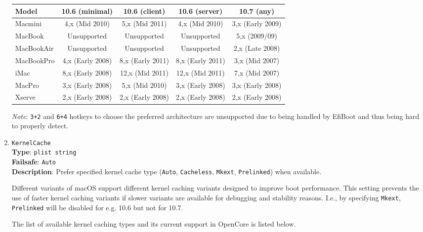 \documentclass[]{article}
\begin{document}
\begin{enumerate}
  \begin{center}
  \begin{tabular}{|p{0.9in}|c|c|c|c|}
  \hline
  \textbf{Model} & \textbf{10.6 (minimal)} & \textbf{10.6 (client)} & \textbf{10.6 (server)} & \textbf{10.7 (any)} \\
  \hline
  Macmini & 4,x (Mid 2010) & 5,x (Mid 2011) & 4,x (Mid 2010) & 3,x (Early 2009) \\
  \hline
  MacBook & Unsupported & Unsupported & Unsupported & 5,x (2009/09) \\
  \hline
  MacBookAir & Unsupported & Unsupported & Unsupported & 2,x (Late 2008) \\
  \hline
  MacBookPro & 4,x (Early 2008) & 8,x (Early 2011) & 8,x (Early 2011) & 3,x (Mid 2007) \\
  \hline
  iMac & 8,x (Early 2008) & 12,x (Mid 2011) & 12,x (Mid 2011) & 7,x (Mid 2007) \\
  \hline
  MacPro & 3,x (Early 2008) & 5,x (Mid 2010) & 3,x (Early 2008) & 3,x (Early 2008) \\
  \hline
  Xserve & 2,x (Early 2008) & 2,x (Early 2008) & 2,x (Early 2008) & 2,x (Early 2008) \\
  \hline
  \end{tabular}
  \end{center}

  \emph{Note}: \texttt{3+2} and \texttt{6+4} hotkeys to choose the preferred
  architecture are unsupported due to being handled by EfiBoot and thus
  being hard to properly detect.

\item
  \texttt{KernelCache}\\
  \textbf{Type}: \texttt{plist\ string}\\
  \textbf{Failsafe}: \texttt{Auto}\\
  \textbf{Description}: Prefer specified kernel cache type (\texttt{Auto}, \texttt{Cacheless},
  \texttt{Mkext}, \texttt{Prelinked}) when available.

  Different variants of macOS support different kernel caching variants designed to improve
  boot performance. This setting prevents the use of faster kernel caching variants
  if slower variants are available for debugging and stability reasons. I.e., by
  specifying \texttt{Mkext}, \texttt{Prelinked} will be disabled for e.g. 10.6 but not for 10.7.

  The list of available kernel caching types and its current support in OpenCore is listed below.


\end{enumerate}
\end{document}
